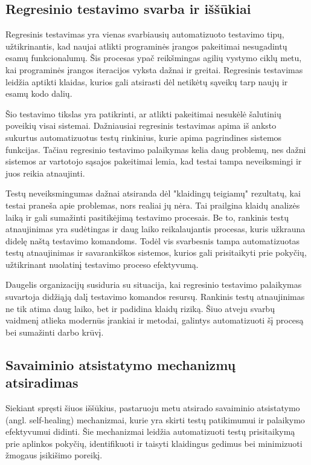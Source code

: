 \documentclass[
]{VUMIFPSkursinis}
\begin{document}
\subsection{Regresinio testavimo svarba ir iššūkiai}

Regresinis testavimas yra vienas svarbiausių automatizuoto testavimo tipų, užtikrinantis, kad naujai atlikti programinės įrangos pakeitimai nesugadintų esamų funkcionalumų. Šis procesas ypač reikšmingas agilių vystymo ciklų metu, kai programinės įrangos iteracijos vyksta dažnai ir greitai. Regresinis testavimas leidžia aptikti klaidas, kurios gali atsirasti dėl netikėtų sąveikų tarp naujų ir esamų kodo dalių.

Šio testavimo tikslas yra patikrinti, ar atlikti pakeitimai nesukėlė šalutinių poveikių visai sistemai. Dažniausiai regresinis testavimas apima iš anksto sukurtus automatizuotus testų rinkinius, kurie apima pagrindines sistemos funkcijas. Tačiau regresinio testavimo palaikymas kelia daug problemų, nes dažni sistemos ar vartotojo sąsajos pakeitimai lemia, kad testai tampa neveiksmingi ir juos reikia atnaujinti.

Testų neveiksmingumas dažnai atsiranda dėl "klaidingų teigiamų" rezultatų, kai testai praneša apie problemas, nors realiai jų nėra. Tai prailgina klaidų analizės laiką ir gali sumažinti pasitikėjimą testavimo procesais. Be to, rankinis testų atnaujinimas yra sudėtingas ir daug laiko reikalaujantis procesas, kuris užkrauna didelę naštą testavimo komandoms. Todėl vis svarbesnis tampa automatizuotas testų atnaujinimas ir savarankiškos sistemos, kurios gali prisitaikyti prie pokyčių, užtikrinant nuolatinį testavimo proceso efektyvumą.

Daugelis organizacijų susiduria su situacija, kai regresinio testavimo palaikymas suvartoja didžiąją dalį testavimo komandos resursų. Rankinis testų atnaujinimas ne tik atima daug laiko, bet ir padidina klaidų riziką. Šiuo atveju svarbų vaidmenį atlieka modernūs įrankiai ir metodai, galintys automatizuoti šį procesą bei sumažinti darbo krūvį.

\subsection{Savaiminio atsistatymo mechanizmų atsiradimas}

Siekiant spręsti šiuos iššūkius, pastaruoju metu atsirado savaiminio atsistatymo (angl. self-healing) mechanizmai, kurie yra skirti testų patikimumui ir palaikymo efektyvumui didinti. Šie mechanizmai leidžia automatizuoti testų prisitaikymą prie aplinkos pokyčių, identifikuoti ir taisyti klaidingus gedimus bei minimizuoti žmogaus įsikišimo poreikį.
\end{document}
